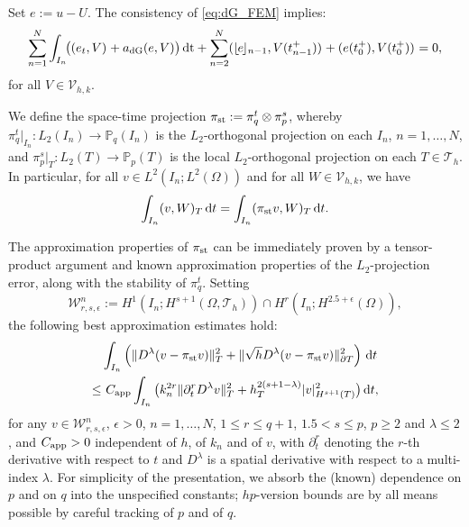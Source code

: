 \documentclass{amsart}
\newcommand{\norm}[2]{\|{#1}\|_{{#2}}}
\newcommand{\ud}{\,{\rm d}}
\newcommand{\tjump}[1]{\lfloor\kern-0.4mm{#1}\kern-0.4mm\rfloor}
\newcommand{\inner}[3]{({#1},{#2})_{{#3}}}
\newcommand{\Th}{\mathcal{T}_h}
\newcommand{\dt}{\,{\rm dt}}
\theoremstyle{definition}
\theoremstyle{remark}
\numberwithin{equation}{section}
\begin{document}
Set $e := u-U$. The consistency of \eqref{eq:dG_FEM} implies:
\begin{equation}\label{eq:ErrorEquation}
\sum_{n=1}^N \int_{I_n}\!\! \big( \inner{e_t}{V}{} + a_{\rm dG}(e,V) \big) \dt + \sum_{n=2}^{N} \inner{\tjump{e}_{n-1}}{V( t_{n-1}^+)}{}
+	\inner{e(t_0^+)}{V(t_0^+)}{}
=
0,
\end{equation}
for all $V\in \mathcal{V}_{h,k}$.

	We define the space-time  projection  $\pi_{\rm st}: = \pi^t_q\otimes \pi^s_p$, whereby $\pi^t_q|_{I_n} \colon L_2(I_n) \to \mathbb{P}_q(I_n)$ is the $L_2$-orthogonal projection on each $I_n$, $n=1,\dots,N$, and  $\pi^s_p|_{T} \colon L_2(T) \to \mathbb{P}_p(T)$ is the local $L_2$-orthogonal projection on each $T\in \Th$. In particular, for all $v\in L^2(I_n; L^2(\Omega))$ and for all $W \in \mathcal{V}_{h,k}$, we have
\begin{equation}\label{def: space-time L2 orthogonal projection}
	\int_{I_n} (v,W)_T \ud t
				=
				\int_{I_n} (\pi_{\rm st}{v},{W})_T \ud t.
\end{equation}

The approximation properties of $\pi_{\rm st}$ can be immediately proven by a tensor-product argument and known approximation properties of the $L_2$-projection error, along with the stability of $ \pi^t_q$. Setting  \[
\mathcal{W}_{r,s,\epsilon}^n:=H^1(I_n;H^{s+1}(\Omega,\Th)) \cap H^{r}(I_n;H^{2.5+\epsilon}(\Omega)),
\] the following best approximation estimates hold:
\begin{equation}\label{eq:space_time_approximation}
	\begin{aligned}
&\int_{I_n}
\left( \norm{D^{\lambda} (v-\pi_{\rm st}v)}{T}^2
+
\norm{\sqrt{h}D^\lambda (v-\pi_{\rm st}v)}{\partial T}^2
\right)\ud t \\
\le&\  C_{\rm app} \int_{I_n}
\big( k^{2r}_n\norm{ \partial_t^r D^\lambda v}{T}^2
+ h^{2(s+1-\lambda)}_T|v|_{H^{s+1}(T)}^2
\big)\ud t,
	\end{aligned}
\end{equation}
for any $v\in\mathcal{W}_{r,s,\epsilon}^n$,
$\epsilon>0$, $n=1,\dots,N$, $1\le r\le q+1$, $1.5< s\le p$, $p\geq2$ and $\lambda\leq 2$, and $C_{\rm app}>0$ independent of $h$, of $k_n$ and of $v$, with $\partial_t^r$ denoting the $r$-th derivative with respect to $t$ and $D^\lambda$ is a spatial derivative with respect to a multi-index $\lambda$. For simplicity of the presentation, we absorb the (known) dependence on $p$ and on $q$ into the unspecified constants; $hp$-version bounds are by all means possible by careful tracking of $p$ and of $q$.
\end{document}
